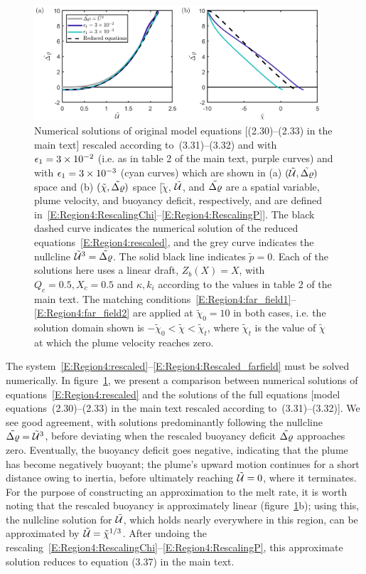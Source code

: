\documentclass{article}
\begin{document}
\begin{figure}
\centering
\includegraphics[width = 0.95\textwidth]{Submitted_PRSA/make_plots/plots/supp_fig1.png}
\caption{Numerical solutions of original model equations [(2.30)--(2.33) in the main text] rescaled according to~(3.31)--(3.32) and with $\epsilon_1 = 3\times 10^{-2}$ (i.e. as in table 2 of the main text, purple curves) and with $\epsilon_1 = 3\times 10^{-3}$ (cyan curves) which are shown in (a) $(\tilde{\mathcal{U}}, \tilde{\Delta \varrho})$ space and (b) $(\tilde{\chi}, \tilde{\Delta \varrho})$ space [$\tilde{\chi}$, $\tilde{\mathcal{U}}$, and $\tilde{\Delta \varrho}$ are a spatial variable, plume velocity, and buoyancy deficit, respectively, and are defined in~\eqref{E:Region4:RescalingChi}--\eqref{E:Region4:RescalingP}]. The black dashed curve indicates the numerical solution of the reduced equations~\eqref{E:Region4:rescaled}, and the grey curve indicates the nullcline $\tilde{\mathcal{U}}^3 = \tilde{\Delta \varrho}$. The solid black line indicates $\tilde{p} = 0$. Each of the solutions here uses a linear draft, $Z_b(X) = X$, with $Q_c = 0.5, X_c = 0.5$ and $\kappa, k_i$ according to the values in table 2 of the main text. The matching conditions~\eqref{E:Region4:far_field1}--\eqref{E:Region4:far_field2} are applied at $\tilde{\chi}_0 = 10$ in both cases, i.e. the solution domain shown is $-\tilde{\chi}_0 < \tilde{\chi} < \tilde{\chi}_t$, where $\tilde{\chi}_t$ is the value of $\tilde{\chi}$ at which the plume velocity reaches zero.}\label{fig:Region4}
\end{figure}

The system~\eqref{E:Region4:rescaled}--\eqref{E:Region4:Rescaled_farfield} must be solved numerically. In figure~\ref{fig:Region4}, we present a comparison between numerical solutions of equations~\eqref{E:Region4:rescaled} and the solutions of the full equations [model equations~(2.30)--(2.33) in the main text rescaled according to~(3.31)--(3.32)]. We see good agreement, with solutions predominantly following the nullcline $\tilde{\Delta \varrho} = \tilde{\mathcal{U}}^3$, before deviating when the rescaled buoyancy deficit $\tilde{\Delta \varrho}$ approaches zero. Eventually, the buoyancy deficit goes negative, indicating that the plume has become negatively buoyant; the plume's upward motion continues for a short distance owing to inertia, before ultimately reaching $\tilde{\mathcal{U}} = 0$, where it terminates. For the purpose of constructing an approximation to the melt rate, it is worth noting that the rescaled buoyancy is approximately linear (figure~\ref{fig:Region4}b); using this, the nullcline solution for $\tilde{\mathcal{U}}$, which holds nearly everywhere in this region, can be approximated by $\tilde{\mathcal{U}} = \tilde{\chi}^{1/3}$. After undoing the rescaling~\eqref{E:Region4:RescalingChi}--\eqref{E:Region4:RescalingP}, this approximate solution reduces to equation (3.37) in the main text. 
\end{document}

